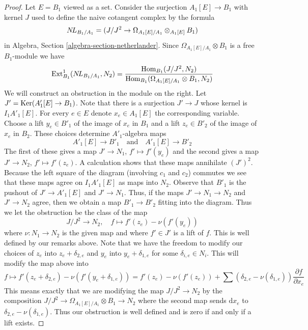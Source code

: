 \begin{proof}
Let $E = B_1$ viewed as a set.
Consider the surjection $A_1[E] \to B_1$ with kernel $J$ used
to define the naive cotangent complex by the formula
$$
\mathop{N\!L}\nolimits_{B_1/A_1} = (J/J^2 \to \Omega_{A_1[E]/A_1} \otimes_{A_1[E]} B_1)
$$
in
Algebra, Section \ref{algebra-section-netherlander}.
Since $\Omega_{A_1[E]/A_1} \otimes B_1$ is a free
$B_1$-module we have
$$
\mathop{\mathrm{Ext}}\nolimits^1_{B_1}(\mathop{N\!L}\nolimits_{B_1/A_1}, N_2) =
\frac{\mathop{\mathrm{Hom}}\nolimits_{B_1}(J/J^2, N_2)}
{\mathop{\mathrm{Hom}}\nolimits_{B_1}(\Omega_{A_1[E]/A_1} \otimes B_1, N_2)}
$$
We will construct an obstruction in the module on the right.
Let $J' = \mathop{\mathrm{Ker}}(A'_1[E] \to B_1)$. Note that there is a surjection
$J' \to J$ whose kernel is $I_1A'_1[E]$.
For every $e \in E$ denote $x_e \in A_1[E]$ the corresponding variable.
Choose a lift $y_e \in B'_1$ of the image of $x_e$ in $B_1$ and
a lift $z_e \in B'_2$ of the image of $x_e$ in $B_2$.
These choices determine $A'_1$-algebra maps
$$
A'_1[E] \to B'_1 \quad\text{and}\quad A'_1[E] \to B'_2
$$
The first of these gives a map $J' \to N_1$, $f' \mapsto f'(y_e)$
and the second gives a map $J' \to N_2$, $f' \mapsto f'(z_e)$.
A calculation shows that these maps annihilate $(J')^2$.
Because the left square of the diagram (involving $c_1$ and $c_2$)
commutes we see that these maps agree on $I_1A'_1[E]$ as maps into $N_2$.
Observe that $B'_1$ is the pushout of $J' \to A'_1[E]$ and $J' \to N_1$. 
Thus, if the maps $J' \to N_1 \to N_2$ and $J' \to N_2$ agree, then we
obtain a map $B'_1 \to B'_2$ fitting into the diagram.
Thus we let the obstruction be the class of the map
$$
J/J^2 \to N_2,\quad f \mapsto f'(z_e) - \nu(f'(y_e))
$$
where $\nu : N_1 \to N_2$ is the given map and where $f' \in J'$
is a lift of $f$. This is well defined by our remarks above.
Note that we have the freedom
to modify our choices of $z_e$ into $z_e + \delta_{2, e}$
and $y_e$ into $y_e + \delta_{1, e}$ for some $\delta_{i, e} \in N_i$.
This will modify the map above into
$$
f \mapsto f'(z_e + \delta_{2, e}) - \nu(f'(y_e + \delta_{1, e})) =
f'(z_e) - \nu(f'(z_e)) +
\sum (\delta_{2, e} - \nu(\delta_{1, e}))\frac{\partial f}{\partial x_e}
$$
This means exactly that we are modifying the map $J/J^2 \to N_2$
by the composition $J/J^2 \to \Omega_{A_1[E]/A_1} \otimes B_1 \to N_2$
where the second map sends $\text{d}x_e$ to
$\delta_{2, e} - \nu(\delta_{1, e})$. Thus our obstruction is well defined
and is zero if and only if a lift exists.


\end{proof}
